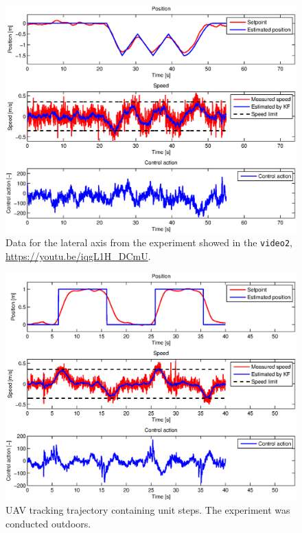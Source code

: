 \begin{figure}[H]
\centering
\begin{sideways}
\includegraphics[scale=0.99]{fig/experiment_outdoor_1_ape.eps}
\end{sideways}
\caption*{Data for the lateral axis from the experiment showed in the \texttt{video2}, \url{https://youtu.be/iqgL1H_DCmU}.}
\end{figure}

\begin{figure}[H]
\centering
\begin{sideways}
\includegraphics[scale=0.99]{fig/experiment_steps_ape.eps}
\end{sideways}
\caption*{UAV tracking trajectory containing unit steps. The experiment was conducted outdoors.}
\end{figure}